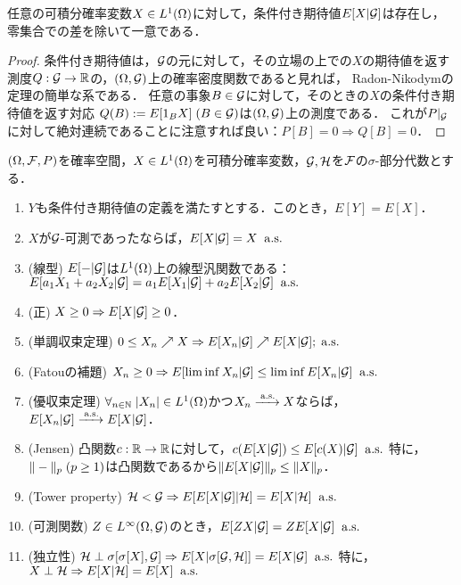 \documentclass[uplatex,dvipdfmx]{jsreport}
\begin{document}
\begin{corollary}
    任意の可積分確率変数$X\in L^1(\Omega)$に対して，条件付き期待値$E[X|\mathcal{G}]$は存在し，零集合での差を除いて一意である．
\end{corollary}
\begin{proof}
    条件付き期待値は，$\mathcal{G}$の元に対して，その立場の上での$X$の期待値を返す測度$Q:\mathcal{G}\to\mathbb{R}$の，$(\Omega,\mathcal{G})$上の確率密度関数であると見れば，
    Radon-Nikodymの定理の簡単な系である．
    任意の事象$B\in\mathcal{G}$に対して，そのときの$X$の条件付き期待値を返す対応
    $Q(B):=E[1_BX]\;(B\in\mathcal{G})$は$(\Omega,\mathcal{G})$上の測度である．
    これが$P|_{\mathcal{G}}$に対して絶対連続であることに注意すれば良い：$P[B]=0\Rightarrow Q[B]=0$．
\end{proof}

\begin{proposition}
    $(\Omega,\mathcal{F},P)$を確率空間，$X\in L^1(\Omega)$を可積分確率変数，$\mathcal{G},\mathcal{H}$を$\mathcal{F}$の$\sigma$-部分代数とする．
    \begin{enumerate}
        \item $Y$も条件付き期待値の定義を満たすとする．このとき，$E[Y]=E[X]$．
        \item $X$が$\mathcal{G}$-可測であったならば，$E[X|\mathcal{G}]=X\;\;\mathrm{a.s.}$
        \item (線型) $E[-|\mathcal{G}]$は$L^1(\Omega)$上の線型汎関数である：$E[a_1X_1+a_2X_2|\mathcal{G}]=a_1E[X_1|\mathcal{G}]+a_2E[X_2|\mathcal{G}]\;\;\mathrm{a.s.}$
        \item (正) $X\ge0\Rightarrow E[X|\mathcal{G}]\ge0$．
        \item (単調収束定理) $0\le X_n\nearrow X\Rightarrow E[X_n|\mathcal{G}]\nearrow E[X|\mathcal{G}];\;\mathrm{a.s.}$
        \item (Fatouの補題) $X_n\ge0\Rightarrow E[\liminf X_n|\mathcal{G}]\le\liminf E[X_n|\mathcal{G}]\;\;\mathrm{a.s.}$
        \item (優収束定理) $\forall_{n\in\mathbb{N}}\;\lvert X_n\rvert\in L^1(\Omega)$かつ$X_n\xrightarrow{\;\mathrm{a.s.}}X$ならば，$E[X_n|\mathcal{G}]\xrightarrow{\;\mathrm{a.s.}}E[X|\mathcal{G}]$．
        \item (Jensen) 凸関数$c:\mathbb{R}\to\mathbb{R}$に対して，$c(E[X|\mathcal{G}])\le E[c(X)|\mathcal{G}]\;\;\mathrm{a.s.}$ 特に，$\|-\|_p\;(p\ge1)$は凸関数であるから$\|E[X|\mathcal{G}]\|_p\le\|X\|_p$．
        \item (Tower property) $\mathcal{H}<\mathcal{G}\Rightarrow E[E[X|\mathcal{G}]|\mathcal{H}]=E[X|\mathcal{H}]\;\;\mathrm{a.s.}$
        \item (可測関数) $Z\in L^\infty(\Omega,\mathcal{G})$のとき，$E[ZX|\mathcal{G}]=ZE[X|\mathcal{G}]\;\;\mathrm{a.s.}$
        \item (独立性) $\mathcal{H}\perp\sigma[\sigma[X],\mathcal{G}]\Rightarrow E[X|\sigma[\mathcal{G},\mathcal{H}]]=E[X|\mathcal{G}]\;\;\mathrm{a.s.}$ 特に，$X\perp\mathcal{H}\Rightarrow E[X|\mathcal{H}]=E[X]\;\;\mathrm{a.s.}$
    \end{enumerate}
\end{proposition}
\end{document}
